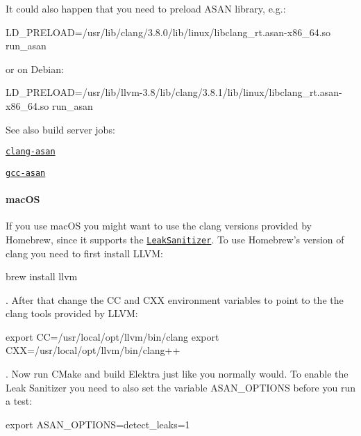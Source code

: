 It could also happen that you need to preload A\+S\+AN library, e.\+g.\+: \begin{DoxyVerb}    LD_PRELOAD=/usr/lib/clang/3.8.0/lib/linux/libclang_rt.asan-x86_64.so run_asan
\end{DoxyVerb}


or on Debian\+: \begin{DoxyVerb}    LD_PRELOAD=/usr/lib/llvm-3.8/lib/clang/3.8.1/lib/linux/libclang_rt.asan-x86_64.so run_asan
\end{DoxyVerb}


See also build server jobs\+:


\begin{DoxyItemize}
\item \href{https://build.libelektra.org/job/elektra-clang-asan/}{\tt clang-\/asan}
\item \href{https://build.libelektra.org/job/elektra-gcc-asan/}{\tt gcc-\/asan}
\end{DoxyItemize}

\paragraph*{mac\+OS}

If you use mac\+OS you might want to use the {\ttfamily clang} versions provided by Homebrew, since it supports the \href{https://github.com/google/sanitizers/wiki/AddressSanitizerLeakSanitizer}{\tt Leak\+Sanitizer}. To use Homebrew’s version of {\ttfamily clang} you need to first install L\+L\+VM\+:


\begin{DoxyCode}
brew install llvm
\end{DoxyCode}


. After that change the {\ttfamily CC} and {\ttfamily C\+XX} environment variables to point to the the clang tools provided by L\+L\+VM\+:


\begin{DoxyCode}
export CC=/usr/local/opt/llvm/bin/clang
export CXX=/usr/local/opt/llvm/bin/clang++
\end{DoxyCode}


. Now run C\+Make and build Elektra just like you normally would. To enable the Leak Sanitizer you need to also set the variable {\ttfamily A\+S\+A\+N\+\_\+\+O\+P\+T\+I\+O\+NS} before you run a test\+:


\begin{DoxyCode}
export ASAN\_OPTIONS=detect\_leaks=1
\end{DoxyCode}


